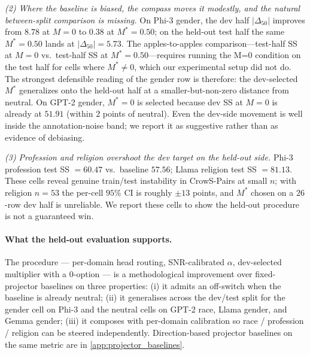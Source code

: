 \emph{(2) Where the baseline is biased, the compass moves it
modestly, and the natural between-split comparison is missing.}
On Phi-3 gender, the dev half $|\Delta_{50}|$ improves from $8.78$
at $M = 0$ to $0.38$ at $M^* = 0.50$; on the held-out test half the
same $M^* = 0.50$ lands at $|\Delta_{50}| = 5.73$. The
apples-to-apples comparison---test-half SS at $M = 0$ vs.\ test-half
SS at $M^* = 0.50$---requires running the M=0 condition on the test
half for cells where $M^* \neq 0$, which our experimental setup
did not do. The strongest defensible reading of the gender row is
therefore: the dev-selected $M^*$ generalizes onto the held-out half
at a smaller-but-non-zero distance from neutral. On GPT-2 gender,
$M^* = 0$ is selected because dev SS at $M = 0$ is already at
$51.91$ (within $2$ points of neutral). Even the dev-side movement
is well inside the \citeauthor{blodgett2021stereotyping}
annotation-noise band; we report it as suggestive rather than as
evidence of debiasing.

\emph{(3) Profession and religion overshoot the dev target on the
held-out side.}
Phi-3 profession test SS $= 60.47$ vs.\ baseline $57.56$;
Llama religion test SS $= 81.13$. These cells reveal genuine
train/test instability in CrowS-Pairs at small $n$; with religion
$n = 53$ the per-cell $95\%$ CI is roughly $\pm 13$ points, and
$M^*$ chosen on a $26$-row dev half is unreliable. We report these
cells to show the held-out procedure is not a guaranteed win.

\paragraph{What the held-out evaluation supports.}
The procedure --- per-domain head routing, SNR-calibrated $\alpha$,
dev-selected multiplier with a $0$-option --- is a methodological
improvement over fixed-projector baselines on three properties:
(i) it admits an off-switch when the baseline is already neutral;
(ii) it generalises across the dev/test split for the gender cell
on Phi-3 and the neutral cells on GPT-2 race, Llama gender, and
Gemma gender; (iii) it composes with per-domain calibration so
race / profession / religion can be steered independently.
Direction-based projector baselines on the same metric are in
\cref{app:projector_baselines}.
